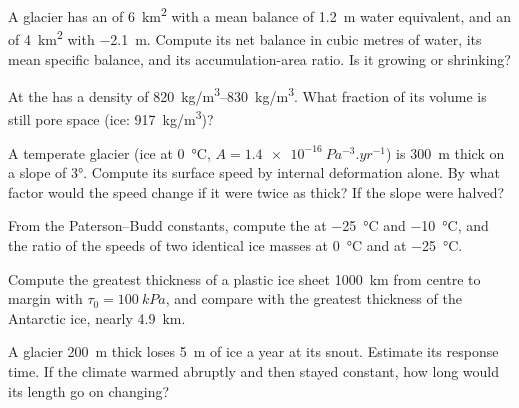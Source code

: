 \begin{exercise}[$\star$]\label{exo:b3:glaciology:3}
A glacier has an  of \qty{6}{km^2} with a mean balance of
\qty{+1.2}{m} water equivalent, and an  of \qty{4}{km^2} with
\qty{-2.1}{m}. Compute its net balance in cubic metres of water, its mean
specific balance, and its accumulation-area ratio. Is it growing or
shrinking?
\end{exercise}

\begin{exercise}[$\star$]\label{exo:b3:glaciology:4}
At  the  has a density of \qtyrange{820}{830}{kg/m^3}.
What fraction of its volume is still pore space (ice:
\qty{917}{kg/m^3})?
\end{exercise}

\begin{exercise}[$\star\star$]\label{exo:b3:glaciology:5}
A temperate glacier (ice at \qty{0}{\celsius}, $A =
\qty{1.4e-16}{Pa^{-3}.yr^{-1}}$) is \qty{300}{m} thick on a slope of
\ang{3}. Compute its surface speed by internal deformation alone. By what
factor would the speed change if it were twice as thick? If the slope were
halved?
\end{exercise}

\begin{exercise}[$\star\star$]\label{exo:b3:glaciology:6}
From the Paterson--Budd constants, compute the  at
\qty{-25}{\celsius} and \qty{-10}{\celsius}, and the ratio of the speeds of
two identical ice masses at \qty{0}{\celsius} and at \qty{-25}{\celsius}.
\end{exercise}

\begin{exercise}[$\star\star$]\label{exo:b3:glaciology:7}
Compute the greatest thickness of a plastic ice sheet \qty{1000}{km} from
centre to margin with $\tau_0 = \qty{100}{kPa}$, and compare with the
greatest thickness of the Antarctic ice, nearly \qty{4.9}{km}.
\end{exercise}

\begin{exercise}[$\star\star$]\label{exo:b3:glaciology:8}
A glacier \qty{200}{m} thick loses \qty{5}{m} of ice a year at its snout.
Estimate its response time. If the climate warmed abruptly and then stayed
constant, how long would its length go on changing?
\end{exercise}

